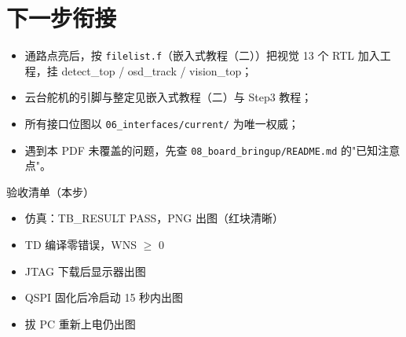 \documentclass[11pt]{ctexart}
\newcommand{\code}[1]{\texttt{#1}}
\begin{document}
\section{下一步衔接}

\begin{itemize}
  \item 通路点亮后，按 \code{filelist.f}（嵌入式教程（二））把视觉
    13 个 RTL 加入工程，挂 detect\_top / osd\_track / vision\_top；
  \item 云台舵机的引脚与整定见嵌入式教程（二）与 Step3 教程；
  \item 所有接口位图以 \code{06\_interfaces/current/} 为唯一权威；
  \item 遇到本 PDF 未覆盖的问题，先查 \code{08\_board\_bringup/README.md}
    的"已知注意点"。
\end{itemize}

\begin{okbox}{验收清单（本步）}
\begin{itemize}
  \item [ ] 仿真：TB\_RESULT PASS，PNG 出图（红块清晰）
  \item [ ] TD 编译零错误，WNS $\geq$ 0
  \item [ ] JTAG 下载后显示器出图
  \item [ ] QSPI 固化后冷启动 15 秒内出图
  \item [ ] 拔 PC 重新上电仍出图
\end{itemize}
\end{okbox}
\end{document}
